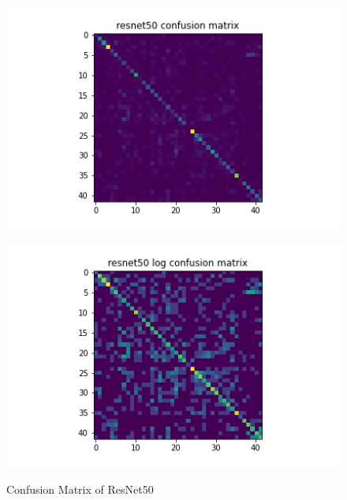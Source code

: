 \begin{figure}[t]
\begin{minipage}[b]{.5\linewidth}
    {\includegraphics[width=1.2\textwidth]{figs/conf_matrix/resnet50_conf.png}}
  \end{minipage}
  \hfill
  \begin{minipage}[b]{.5\linewidth}
    \centering

    {\includegraphics[width=1.2\textwidth]{figs/conf_matrix/resnet50_log_conf.png}}
  \end{minipage}

  \caption{Confusion Matrix of ResNet50}
  \label{fig:resnet50_conf}
  \vspace{0.2in}
\end{figure}

